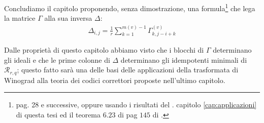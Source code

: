 Concludiamo il capitolo proponendo, senza dimostrazione, una formula\footnote{\cite{cerruti} pag. 28 e successive, oppure usando i risultati del . capitolo \ref{cap:applicazioni} di questa tesi ed il teorema $6.23$ di pag $145$ di \cite{berardi}.} che lega la matrice $\Gamma$ alla sua inversa $\Delta$:
\begin{align*}
   \Delta_{i,j} = \frac{1}{r} \sum_{k=1}^{m(v)-1} \Gamma_{k,j-i+k}^{(v)}
\end{align*}

Dalle proprietà di questo capitolo abbiamo visto che i blocchi di $\Gamma$ determinano gli ideali e che le prime colonne di $\Delta$ determinano gli idempotenti minimali di $\mathcal{R}_{r,q}$; questo fatto sarà una delle basi delle applicazioni della trasformata di Winograd alla teoria dei codici correttori proposte nell'ultimo capitolo.